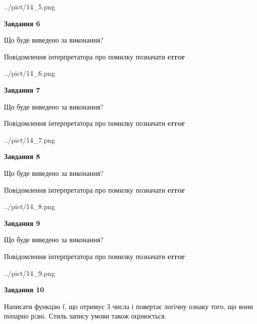 \documentclass[12pt, ukrainian]{article}
\begin{document}
{\begin {large}
\begin{center}
	{../pict/14_5.png}
\end{center}
\newpage

{\begin {center}\textbf{Завдання 6}\end {center}}\par
Що буде виведено за виконання? \par
Повідомлення інтерпретатора про помилку позначати \textbf{error}

\begin{center}
	{../pict/14_6.png}
\end{center}
\newpage

{\begin {center}\textbf{Завдання 7}\end {center}}\par
Що буде виведено за виконання? \par
Повідомлення інтерпретатора про помилку позначати \textbf{error}

\begin{center}
	{../pict/14_7.png}
\end{center}
\newpage

{\begin {center}\textbf{Завдання 8}\end {center}}\par
Що буде виведено за виконання? \par
Повідомлення інтерпретатора про помилку позначати \textbf{error}

\begin{center}
	{../pict/14_8.png}
\end{center}
\newpage

{\begin {center}\textbf{Завдання 9}\end {center}}\par
Що буде виведено за виконання? \par
Повідомлення інтерпретатора про помилку позначати \textbf{error}

\begin{center}
	{../pict/14_9.png}
\end{center}
\newpage

{\begin {center}\textbf{Завдання 10}\end {center}}\par

Написати функцiю f, що отримує 3 числа і повертає логічну ознаку того, що вони попарно рiзнi. Стиль запису умови також оцінюється.\par
\newpage

\end {large}}
\end{document}
